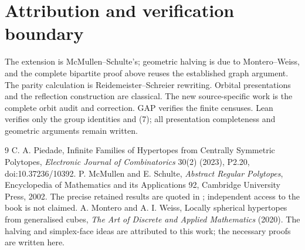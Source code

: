 \section{Attribution and verification boundary}\label{attribution-and-verification-boundary}

The extension is McMullen--Schulte's; geometric halving is due to Montero--Weiss, and the complete bipartite proof above reuses the established graph argument. The parity calculation is Reidemeister--Schreier rewriting. Orbital presentations and the reflection construction are classical. The new source-specific work is the complete orbit audit and correction. GAP verifies the finite censuses. Lean verifies only the group identities and (7); all presentation completeness and geometric arguments remain written.

\begin{thebibliography}{9}
 C. A. Piedade, Infinite Families of Hypertopes from Centrally Symmetric Polytopes, \emph{Electronic Journal of Combinatorics} 30(2) (2023), P2.20, doi:10.37236/10392.
 P. McMullen and E. Schulte, \emph{Abstract Regular Polytopes}, Encyclopedia of Mathematics and its Applications 92, Cambridge University Press, 2002. The precise retained results are quoted in \cite{P}; independent access to the book is not claimed.
 A. Montero and A. I. Weiss, Locally spherical hypertopes from generalised cubes, \emph{The Art of Discrete and Applied Mathematics} (2020). The halving and simplex-face ideas are attributed to this work; the necessary proofs are written here.
\end{thebibliography}
